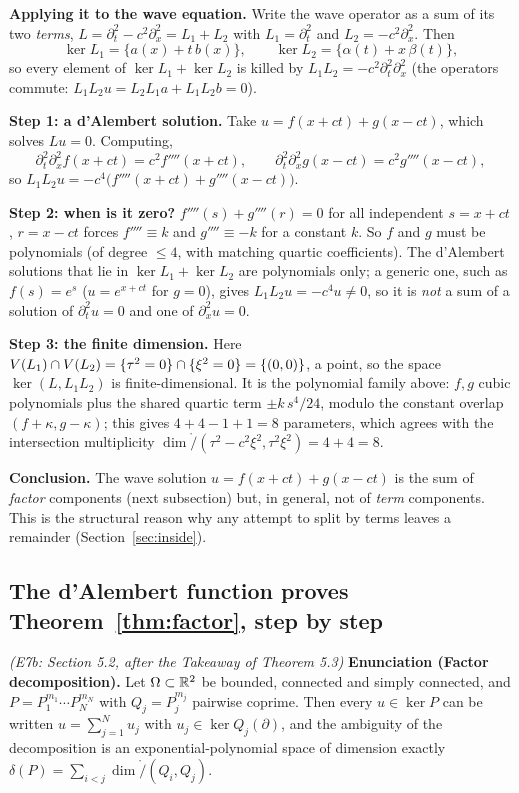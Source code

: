 \medskip\textbf{Applying it to the wave equation.} Write the wave operator as a sum of its two \emph{terms}, $L=\partial_t^2-c^2\partial_x^2=L_1+L_2$ with $L_1=\partial_t^2$ and $L_2=-c^2\partial_x^2$. Then
\[
\ker L_1=\{a(x)+t\,b(x)\},\qquad \ker L_2=\{\alpha(t)+x\,\beta(t)\},
\]
so every element of $\ker L_1+\ker L_2$ is killed by $L_1L_2=-c^2\partial_t^2\partial_x^2$ (the operators commute: $L_1L_2u=L_2L_1a+L_1L_2b=0$).

\medskip\textbf{Step 1: a d'Alembert solution.} Take $u=f(x+ct)+g(x-ct)$, which solves $Lu=0$. Computing,
\[
\partial_t^2\partial_x^2f(x+ct)=c^2f''''(x+ct),\qquad \partial_t^2\partial_x^2g(x-ct)=c^2g''''(x-ct),
\]
so $L_1L_2u=-c^4\big(f''''(x+ct)+g''''(x-ct)\big)$.

\medskip\textbf{Step 2: when is it zero?} $f''''(s)+g''''(r)=0$ for all independent $s=x+ct$, $r=x-ct$ forces $f''''\equiv k$ and $g''''\equiv-k$ for a constant $k$. So $f$ and $g$ must be polynomials (of degree $\le4$, with matching quartic coefficients). The d'Alembert solutions that lie in $\ker L_1+\ker L_2$ are polynomials only; a generic one, such as $f(s)=e^s$ ($u=e^{x+ct}$ for $g=0$), gives $L_1L_2u=-c^4u\ne0$, so it is \emph{not} a sum of a solution of $\partial_t^2u=0$ and one of $\partial_x^2u=0$.

\medskip\textbf{Step 3: the finite dimension.} Here $V(L_1)\cap V(L_2)=\{\tau^2=0\}\cap\{\xi^2=0\}=\{(0,0)\}$, a point, so the space $\ker(L,L_1L_2)$ is finite-dimensional. It is the polynomial family above: $f,g$ cubic polynomials plus the shared quartic term $\pm k\,s^4/24$, modulo the constant overlap $(f+\kappa,g-\kappa)$; this gives $4+4-1+1=8$ parameters, which agrees with the intersection multiplicity $\dim\ring/(\tau^2-c^2\xi^2,\tau^2\xi^2)=4+4=8$.

\medskip\textbf{Conclusion.} The wave solution $u=f(x+ct)+g(x-ct)$ is the sum of \emph{factor} components (next subsection) but, in general, not of \emph{term} components. This is the structural reason why any attempt to split by terms leaves a remainder (Section~\ref{sec:inside}).

\subsection{The d'Alembert function proves Theorem~\ref{thm:factor}, step by step}\label{expl:E7b}
\noindent\emph{(E7b: Section 5.2, after the Takeaway of Theorem 5.3)}
\textbf{Enunciation (Factor decomposition).} Let $\Omega\subset\mathbb{R}^2$ be bounded, connected and simply connected, and $P=P_1^{m_1}\cdots P_N^{m_N}$ with $Q_j=P_j^{m_j}$ pairwise coprime. Then every $u\in\ker P$ can be written $u=\sum_{j=1}^Nu_j$ with $u_j\in\ker Q_j(\partial)$, and the ambiguity of the decomposition is an exponential-polynomial space of dimension exactly $\delta(P)=\sum_{i<j}\dim\ring/(Q_i,Q_j)$.

